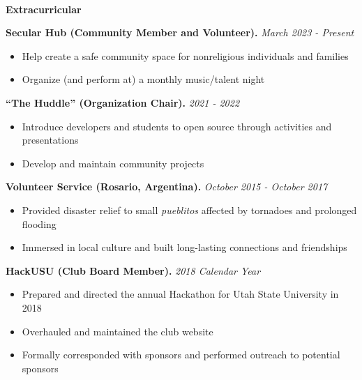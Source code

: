\documentclass[letterpaper,11pt]{article}
\begin{document}

\begin{Large}\textbf{\\Extracurricular}\end{Large}

\textbf{Secular Hub (Community Member and Volunteer).} \textit{March 2023 - Present}
\begin{itemize}[noitemsep,topsep=0pt]
	\item Help create a safe community space for nonreligious individuals and families
	\item Organize (and perform at) a monthly music/talent night\\
\end{itemize}

\textbf{``The Huddle'' (Organization Chair).} \textit{2021 - 2022}
\begin{itemize}[noitemsep,topsep=0pt]
	\item Introduce developers and students to open source through activities and presentations
	\item Develop and maintain community projects\\
\end{itemize}

\textbf{Volunteer Service (Rosario, Argentina).} \textit{October 2015 - October 2017}
\begin{itemize}[noitemsep,topsep=0pt]
	\item Provided disaster relief to small \textit{pueblitos} affected by tornadoes and prolonged flooding
	\item Immersed in local culture and built long-lasting connections and friendships\\
\end{itemize}

\textbf{HackUSU (Club Board Member).} \textit{2018 Calendar Year}
\begin{itemize}[noitemsep,topsep=0pt]
	\item Prepared and directed the annual Hackathon for Utah State University in 2018
	\item Overhauled and maintained the club website
	\item Formally corresponded with sponsors and performed outreach to potential sponsors\\
\end{itemize}
\end{document}
